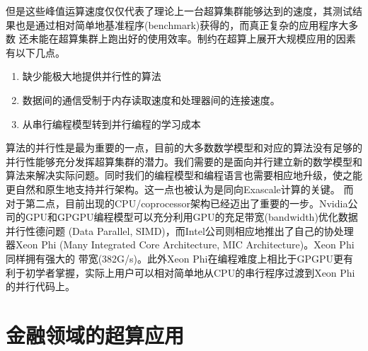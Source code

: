 但是这些峰值运算速度仅仅代表了理论上一台超算集群能够达到的速度，其测试结果也是通过相对简单地基准程序(benchmark)获得的，而真正复杂的应用程序大多数
还未能在超算集群上跑出好的使用效率。制约在超算上展开大规模应用的因素有以下几点。
\begin{enumerate}
    \item 缺少能极大地提供并行性的算法
	\item 数据间的通信受制于内存读取速度和处理器间的连接速度。
	\item 从串行编程模型转到并行编程的学习成本
\end{enumerate}
算法的并行性是最为重要的一点，目前的大多数数学模型和对应的算法没有足够的并行性能够充分发挥超算集群的潜力。我们需要的是面向并行建立新的数学模型和
算法来解决实际问题。同时我们的编程模型和编程语言也需要相应地升级，使之能更自然和原生地支持并行架构。这一点也被认为是同向Exascale计算的关键。
而对于第二点，目前出现的CPU/coprocessor架构已经迈出了重要的一步。Nvidia公司的GPU和GPGPU编程模型可以充分利用GPU的充足带宽(bandwidth)优化数据并行性德问题
(Data Parallel, SIMD)，而Intel公司则相应地推出了自己的协处理器Xeon Phi (Many Integrated Core Architecture, MIC Architecture)。Xeon Phi同样拥有强大的
带宽(382G/s)。此外Xeon Phi在编程难度上相比于GPGPU更有利于初学者掌握，实际上用户可以相对简单地从CPU的串行程序过渡到Xeon Phi的并行代码上。


\section{金融领域的超算应用} %
\label{sec:intro-finance}



